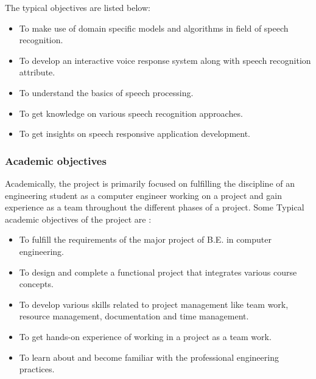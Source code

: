 The typical objectives are listed below:
\begin{itemize}
	\item To make use of domain specific models and algorithms in field of speech recognition.
	\item To develop an interactive voice response system along with speech recognition attribute.
	\item To understand the basics of speech processing.
	\item To get knowledge on various speech recognition approaches.
	\item To get insights on speech responsive application development.
\end{itemize}

\subsubsection{Academic objectives}
Academically, the project is primarily focused on fulfilling the discipline of an engineering student as a computer engineer working on a project and gain experience as a team throughout the different phases of a project. Some Typical academic objectives of the project are :
\begin{itemize}
	\item To fulfill the requirements of the major project of B.E. in computer engineering.
	\item To design and complete a functional project that integrates various course concepts.
	\item To develop various skills related to project management like team work, resource management, documentation and time management.
	\item To get hands-on experience of working in a project as a team work.
	\item To learn about and become familiar with the professional engineering practices.
\end{itemize}
